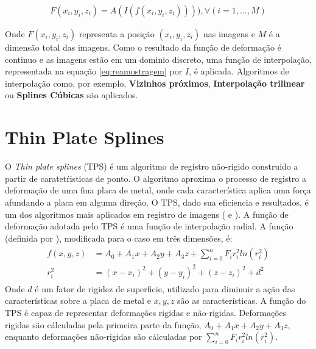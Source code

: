 \begin{align}\label{eq:reamostragem}
    F(x_i, y_i, z_i) = A(I(f(x_i, y_i, z_i)))), \forall (i = 1, \dots, M)
\end{align}

  Onde $F(x_i, y_i, z_i)$ representa a posição $(x_i, y_i, z_i)$ nas imagens e
$M$ é a dimensão total das imagens.
  Como o resultado da função de deformação é continuo e as imagens estão em um
dominio discreto, uma função de interpolação, representada na equação \ref{eq:reamostragem}
por $I$, é aplicada. Algoritmos de interpolação como, por exemplo,
\textbf{Vizinhos próximos}, \textbf{Interpolação trilinear} ou \textbf{Splines Cúbicas}
são aplicados.


\section{Thin Plate Splines}\label{thinPlateSplines}
  O \textit{Thin plate splines} (TPS) é um algoritmo de registro não-rigido construido
a partir de caratetŕisticas de ponto. O algoritmo aproxima o processo de registro
a deformação de uma fina placa de metal, onde cada característica aplica uma força
afundando a placa em alguma direção. O TPS, dado sua eficiencia e resultados, é
um dos algoritmos mais aplicados em registro de imagens (\cite{goshtasby2005} e
\cite{rohr1999approximating}).
  A função de deformação adotada pelo TPS é uma função de interpolação radial. A
função (definida por \cite{bookstein1989principal}), modificada para o caso em
três dimensões, é:
\begin{align}\label{math:tps}
  \begin{split}
    f(x, y, z) &= A_0 + A_1x + A_2y + A_3z + \sum_{i=0}^n F_i r_i^2 ln (r_i^2) \\
    r_i^2 &= (x-x_i)^2 + (y-y_i)^2 + (z-z_i)^2 + d^2
  \end{split}
\end{align}
  Onde $d$ é um fator de rigidez de superficie, utilizado para diminuir a ação
das características sobre a placa de metal e $x, y, z$ são as características. A
função do TPS é capaz de representar deformações rigidas e não-rigidas.
Deformações rigidas são cálculadas pela primeira parte da função,
$A_0 + A_1x + A_2y + A_3z$, enquanto deformações não-rigidas são cálculadas por
$\sum_{i=0}^n F_i r_i^2 ln (r_i^2)$.

